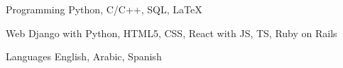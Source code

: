 
\begin{cvskills}

    \cvskill
        {Programming} %
        {Python, C/C++, SQL, LaTeX} %

    \cvskill
        {Web} %
        {Django with Python, HTML5, CSS, React with JS, TS, Ruby on Rails} %

    \cvskill
        {Languages} %
        {English, Arabic, Spanish} %

\end{cvskills}